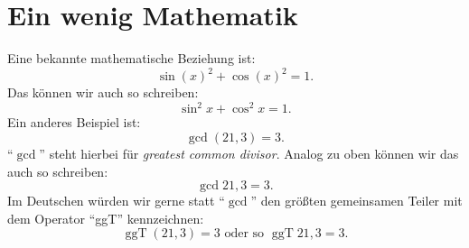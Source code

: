\documentclass[12pt,a4paper]{scrartcl}
\DeclareMathOperator{\ggT}{ggT}
\begin{document}
%
\section{Ein wenig Mathematik}	
Eine bekannte mathematische Beziehung ist:
%
\[
  \sin(x)^{2} + \cos(x)^{2} = 1.
\]
Das können wir auch so schreiben:
%
\[
  \sin^{2} x + \cos^{2} x = 1.
\]
Ein anderes Beispiel ist:
%
\[
  \gcd(21, 3) = 3.
\]
\enquote{$\gcd$} steht hierbei für \emph{greatest common divisor}. Analog zu oben können wir das auch so schreiben:
%
\[
  \gcd 21, 3 = 3.
\]
Im Deutschen würden wir gerne statt \enquote{$\gcd$} den größten gemeinsamen Teiler
mit dem Operator \enquote{ggT} kennzeichnen:
%
\[
  \ggT(21, 3) = 3 \text{ oder so } \ggT 21, 3 = 3.
\]
\end{document}
